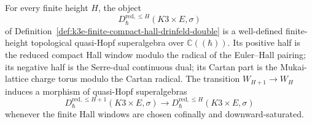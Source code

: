\begin{theorem}
\label{thm:k3e-finite-compact-hall-drinfeld-double}
For every finite height \(H\), the object
\[
 D^{\mathrm{red},\leq H}_{\hbar}(K3\times E,\sigma)
\]
of Definition~\ref{def:k3e-finite-compact-hall-drinfeld-double} is a
well-defined finite-height topological quasi-Hopf superalgebra over
\(\mathbb C((\hbar))\). Its positive half is the reduced compact Hall
window modulo the radical of the Euler--Hall pairing; its negative half
is the Serre-dual continuous dual; its Cartan part is the Mukai-lattice
charge torus modulo the Cartan radical. The transition
\(W_{H+1}\to W_H\) induces a morphism of quasi-Hopf superalgebras
\[
 D^{\mathrm{red},\leq H+1}_{\hbar}(K3\times E,\sigma)
 \longrightarrow
 D^{\mathrm{red},\leq H}_{\hbar}(K3\times E,\sigma)
\]
whenever the finite Hall windows are chosen cofinally and
downward-saturated.
\end{theorem}


